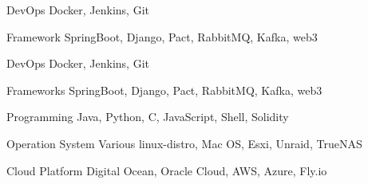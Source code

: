 
\begin{cvskills}
   
\cvskill
{DevOps} %
{Docker, Jenkins, Git} %

  \cvskill
    {Framework} %
    {SpringBoot, Django, Pact, RabbitMQ, Kafka, web3} %

  \cvskill
    {DevOps} %
    {Docker, Jenkins, Git} %

  \cvskill
    {Frameworks} %
    {SpringBoot, Django, Pact, RabbitMQ, Kafka, web3} %

  \cvskill
    {Programming} %
    {Java, Python, C, JavaScript, Shell, Solidity} %

  \cvskill
    {Operation System} %
    {Various linux-distro, Mac OS, Esxi, Unraid, TrueNAS} %

  \cvskill
    {Cloud Platform} %
    {Digital Ocean, Oracle Cloud, AWS, Azure, Fly.io} %

\end{cvskills}
